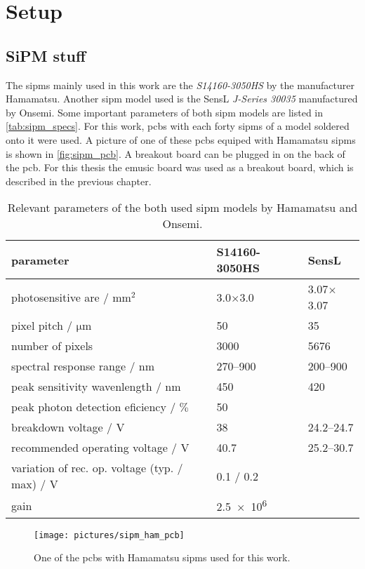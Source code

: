 \chapter{Setup}

\section{SiPM stuff}
The \acp{sipm} mainly used in this work are the \textit{S14160-3050HS} by the manufacturer Hamamatsu.
Another \ac{sipm} model used is the SensL \textit{J-Series 30035} manufactured by Onsemi.
Some important parameters of both \ac{sipm} models are listed in \autoref{tab:sipm_specs}.
For this work, \acp{pcb} with each forty \acp{sipm} of a model soldered onto it were used.
A picture of one of these \acp{pcb} equiped with Hamamatsu \acp{sipm} is shown in \autoref{fig:sipm_pcb}.
A breakout board can be plugged in on the back of the \ac{pcb}.
For this thesis the \ac{emusic} board was used as a breakout board, which is described in the previous chapter.
\begin{table}
	\centering
	\caption[SiPM parameters]{Relevant parameters of the both used \ac{sipm} models by Hamamatsu and Onsemi. \cite{}}
	\label{tab:sipm_specs}
	\renewcommand{\arraystretch}{1.3}
	\begin{tabularx}{\textwidth}{Xp{}p{}}
	    \toprule
	    parameter								& S14160-3050HS		& SensL			\\\midrule
	    photosensitive are / $\si{\milli\meter\squared}$			& 3.0$\times$3.0	& 3.07$\times$3.07	\\
	    pixel pitch / $\si{\micro\meter}$					& 50			& 35			\\
	    number of pixels							& 3000			& \num{5676}		\\
	    spectral response range / $\si{\nano\meter}$			& \numrange{270}{900}	& \numrange{200}{900}	\\
	    peak sensitivity wavenlength / $\si{\nano\meter}$			& 450			& 420			\\
	    peak photon detection eficiency / $\si{\percent}$			& 50			& 			\\
	    breakdown voltage / $\si{\volt}$					& 38			& \numrange{24.2}{24.7}	\\
	    recommended operating voltage / $\si{\volt}$			& 40.7			& \numrange{25.2}{30.7}	\\
	    variation of rec. op. voltage (typ. / max) / $\si{\volt}$		& 0.1 / 0.2		&			\\
	    gain								& \num{2.5e6}		&			\\
	    \bottomrule
	\end{tabularx}
	\renewcommand{\arraystretch}{1}
\end{table} 
\begin{figure}
	\centering
	\texttt{[image: pictures/sipm\_ham\_pcb]}
	\caption[\ac{pcb} with Hamamatsu \acp{sipm}]{One of the \acp{pcb} with Hamamatsu \acp{sipm} used for this work.}
	\label{fig:sipm_pcb}
\end{figure}

